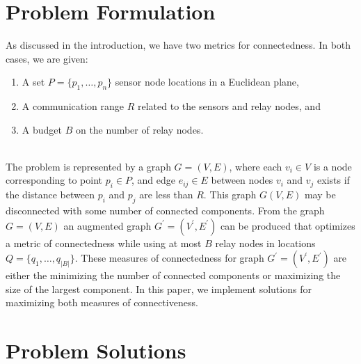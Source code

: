 \documentclass{article}
\begin{document}
\section{Problem Formulation}
As discussed in the introduction, we have two metrics for connectedness. In both cases, we are given:
\begin{enumerate}
\item A set $P=\{p_1, \hdots, p_n\}$ sensor node locations in a Euclidean plane,
\item A communication range $R$ related to the sensors and relay nodes, and
\item A budget $B$  on the number of relay nodes.
\end{enumerate}
\\
The problem is represented by a graph $G=(V,E)$, where each $v_i\in V$ is a node corresponding to point $p_i\in P$, and edge $e_{ij}\in E$ between nodes $v_i$ and $v_j$ exists if the distance between $p_i$ and $p_j$ are less than $R$.
This graph $G(V, E)$ may be disconnected with some number of connected components.
From the graph $G=(V,E)$ an augmented graph $G^\prime=(V^\prime, E^\prime)$ can be produced that optimizes a metric of connectedness while using at most $B$ relay nodes in locations $Q=\{q_1, \hdots, q_{|B|}\}$.
These measures of connectedness for graph $G^\prime=(V^\prime, E^\prime)$ are either the minimizing the number of connected components or maximizing the size of the largest component.
In this paper, we implement solutions for maximizing both measures of connectiveness.

\section{Problem Solutions}
\end{document}
